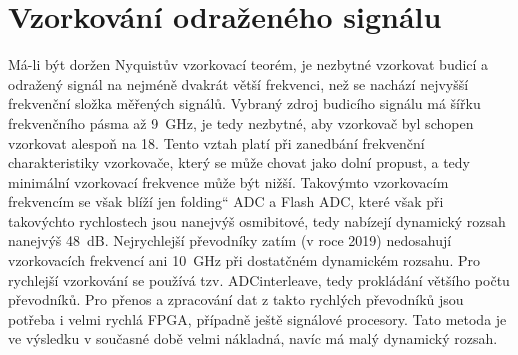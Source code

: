 \chapter{Vzorkování odraženého signálu}
Má-li být doržen Nyquistův vzorkovací teorém, je nezbytné vzorkovat budicí a odražený signál na nejméně dvakrát větší frekvenci, než se nachází nejvyšší frekvenční složka měřených signálů. Vybraný zdroj budicího signálu má šířku frekvenčního pásma až \SI{9}{\giga\hertz}, je tedy nezbytné, aby vzorkovač byl schopen vzorkovat alespoň na \SI{18}{\gigasample}. Tento vztah platí při zanedbání frekvenční charakteristiky vzorkovače, který se může chovat jako dolní propust, a tedy minimální vzorkovací frekvence může být nižší. Takovýmto vzorkovacím frekvencím se však blíží jen \quotedblbase folding\textquotedblleft{} ADC a Flash \acrshort{ADC}, které však při takovýchto rychlostech jsou nanejvýš osmibitové, tedy nabízejí dynamický rozsah nanejvýš \SI{48}{\deci\bel}. Nejrychlejší převodníky zatím (v roce 2019) nedosahují vzorkovacích frekvencí ani \SI{10}{\giga\hertz} při dostatčném dynamickém rozsahu. Pro rychlejší vzorkování se používá tzv. \gls{ADCinterleave}, tedy prokládání většího počtu převodníků. Pro přenos a zpracování dat z takto rychlých převodníků jsou potřeba i velmi rychlá FPGA, případně ještě signálové procesory. Tato metoda je ve výsledku v současné době velmi nákladná, navíc má malý dynamický rozsah.

